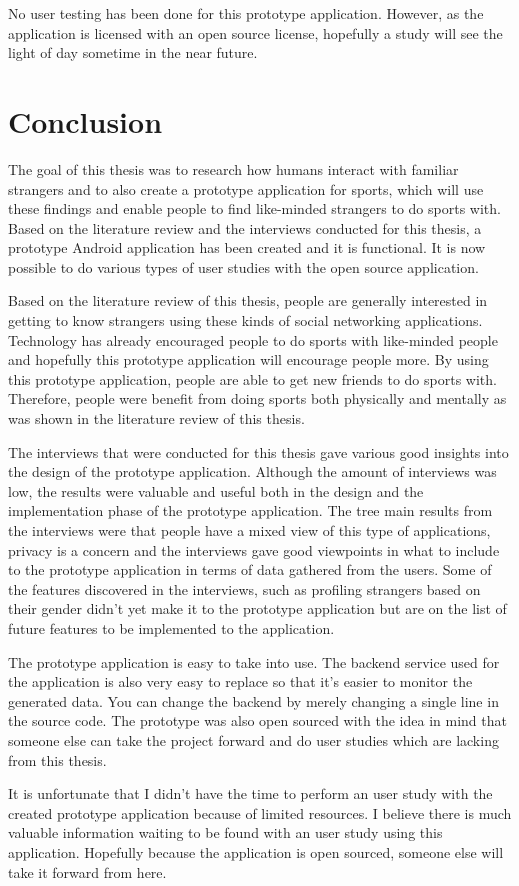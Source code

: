 No user testing has been done for this prototype application. However, as the application is licensed with an open source license, hopefully a study will see the light of day sometime in the near future.
\clearpage

\section{Conclusion}

The goal of this thesis was to research how humans interact with familiar strangers and to also create a prototype application for sports, which will use these findings and enable people to find like-minded strangers to do sports with. Based on the literature review and the interviews conducted for this thesis, a prototype Android application has been created and it is functional. It is now possible to do various types of user studies with the open source application.

Based on the literature review of this thesis, people are generally interested in getting to know strangers using these kinds of social networking applications. Technology has already encouraged people to do sports with like-minded people and hopefully this prototype application will encourage people more. By using this prototype application, people are able to get new friends to do sports with. Therefore, people were benefit from doing sports both physically and mentally as was shown in the literature review of this thesis.

The interviews that were conducted for this thesis gave various good insights into the design of the prototype application. Although the amount of interviews was low, the results were valuable and useful both in the design and the implementation phase of the prototype application. The tree main results from the interviews were that people have a mixed view of this type of applications, privacy is a concern and the interviews gave good viewpoints in what to include to the prototype application in terms of data gathered from the users. Some of the features discovered in the interviews, such as profiling strangers based on their gender didn't yet make it to the prototype application but are on the list of future features to be implemented to the application.

The prototype application is easy to take into use. The backend service used for the application is also very easy to replace so that it's easier to monitor the generated data. You can change the backend by merely changing a single line in the source code. The prototype was also open sourced with the idea in mind that someone else can take the project forward and do user studies which are lacking from this thesis.

It is unfortunate that I didn't have the time to perform an user study with the created prototype application because of limited resources. I believe there is much valuable information waiting to be found with an user study using this application. Hopefully because the application is open sourced, someone else will take it forward from here.

